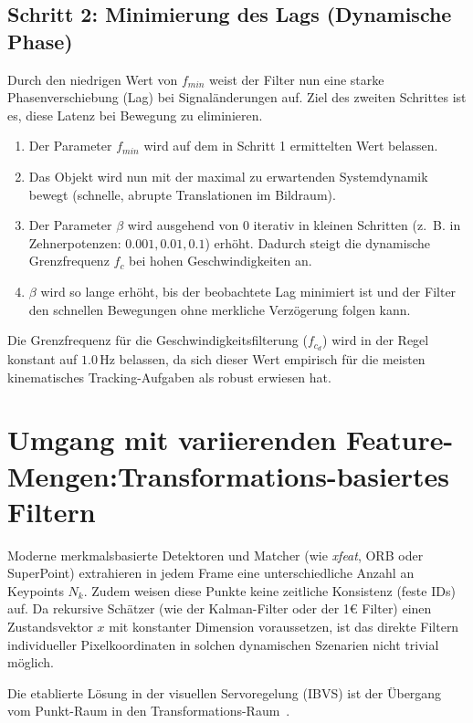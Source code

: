 \documentclass{article}
\begin{document}
\subsection{Schritt 2: Minimierung des Lags (Dynamische Phase)}
Durch den niedrigen Wert von $f_{min}$ weist der Filter nun eine starke Phasenverschiebung (Lag) bei Signaländerungen auf. Ziel des zweiten Schrittes ist es, diese Latenz bei Bewegung zu eliminieren.
\begin{enumerate}
    \item Der Parameter $f_{min}$ wird auf dem in Schritt 1 ermittelten Wert belassen.
    \item Das Objekt wird nun mit der maximal zu erwartenden Systemdynamik bewegt (schnelle, abrupte Translationen im Bildraum).
    \item Der Parameter $\beta$ wird ausgehend von $0$ iterativ in kleinen Schritten (z.~B. in Zehnerpotenzen: $0.001, 0.01, 0.1$) erhöht. Dadurch steigt die dynamische Grenzfrequenz $f_c$ bei hohen Geschwindigkeiten an.
    \item $\beta$ wird so lange erhöht, bis der beobachtete Lag minimiert ist und der Filter den schnellen Bewegungen ohne merkliche Verzögerung folgen kann.
\end{enumerate}
Die Grenzfrequenz für die Geschwindigkeitsfilterung ($f_{c_d}$) wird in der Regel konstant auf $1.0\,\text{Hz}$ belassen, da sich dieser Wert empirisch für die meisten kinematisches Tracking-Aufgaben als robust erwiesen hat.

\section{Umgang mit variierenden Feature-Mengen:\newline Transformations-basiertes Filtern}
\label{sec:transformation_filtering}

Moderne merkmalsbasierte Detektoren und Matcher (wie \textit{xfeat}, ORB oder SuperPoint) extrahieren in jedem Frame eine unterschiedliche Anzahl an Keypoints $N_k$. Zudem weisen diese Punkte keine zeitliche Konsistenz (feste IDs) auf. Da rekursive Schätzer (wie der Kalman-Filter oder der 1\euro{} Filter) einen Zustandsvektor $x$ mit konstanter Dimension voraussetzen, ist das direkte Filtern individueller Pixelkoordinaten in solchen dynamischen Szenarien nicht trivial möglich.

Die etablierte Lösung in der visuellen Servoregelung (IBVS) ist der Übergang vom Punkt-Raum in den Transformations-Raum~\cite{malis19992half, benhimane2007homography}.
\end{document}
